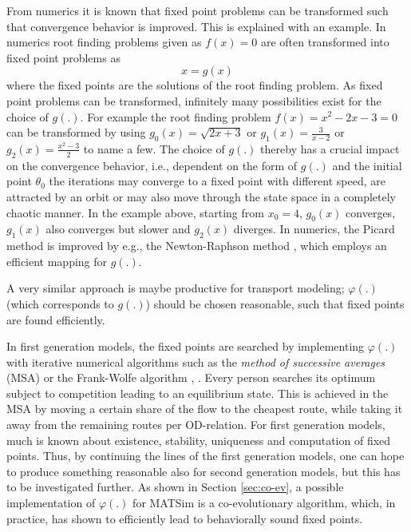 From numerics it is known that fixed point problems can be transformed such that convergence behavior is improved. This is explained with an example. In numerics root finding problems given as $f(x)=0$ are often transformed into fixed point problems as
\begin{equation}
\label{eq:fpf}
x=g(x)
\end{equation}
where the fixed points are the solutions of the root finding problem. As fixed point problems can be transformed, infinitely many possibilities exist for the choice of $g(.)$. For example the root finding problem $f(x)=x^2-2x-3=0$ can be transformed by using $g_0(x)=\sqrt{2x+3}$ or $g_1(x)=\frac{3}{x-2}$ or $g_2(x)=\frac{x^2-3}{2}$ to name a few. The choice of $g(.)$ thereby has a crucial impact on the convergence behavior, i.e., dependent on the form of $g(.)$ and the initial point $\theta_0$ the iterations may converge to a fixed point with different speed, are attracted by an orbit or may also move through the state space in a completely chaotic manner. In the example above, starting from $x_0=4$, $g_0(x)$ converges, $g_1(x)$ also converges but slower and $g_2(x)$ diverges. In numerics, the Picard method \citep[][p.2ff]{Vogt_TechRep_IfMath_2001} is improved by e.g., the Newton-Raphson method \citep[][p.28ff]{Vogt_TechRep_IfMath_2001}, which employs an efficient mapping for $g(.)$. 

A very similar approach is maybe productive for transport modeling; $\varphi(.)$ (which corresponds to $g(.)$) should be chosen reasonable, such that fixed points are found efficiently.

In first generation models, the fixed points are searched by implementing $\varphi(.)$ with iterative numerical algorithms such as the \emph{method of successive averages} (MSA) \citep[][p.342f]{OrtuzarWillumsen_2001} or the Frank-Wolfe algorithm \citep[][]{FrankWolfe_NRLQ_1956}, \citep[see also][p.4]{CorreaStier_Cochran_2010}. Every person searches its optimum subject to competition leading to an equilibrium state. This is achieved in the MSA by moving a certain share of the flow to the cheapest route, while taking it away from the remaining routes per OD-relation. For first generation models, much is known about existence, stability, uniqueness and computation of fixed points. Thus, by continuing the lines of the first generation models, one can hope to produce something reasonable also for second generation models, but this has to be investigated further. As shown in Section \ref{sec:co-ev}, a possible implementation of $\varphi(.)$ for MATSim is a co-evolutionary algorithm, which, in practice, has shown to efficiently lead to behaviorally sound fixed points.

